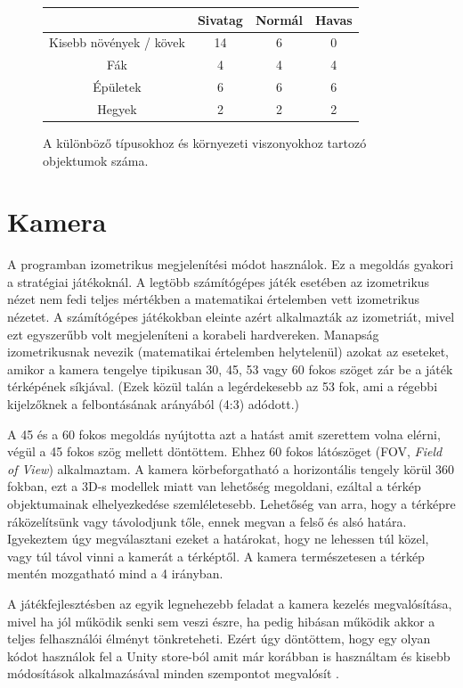 \begin{figure}[h!]
  \centering
  \begin{tabular}{ | c | c | c | c | }
    \hline
     & Sivatag & Normál & Havas \\ \hline
    Kisebb növények / kövek & 14 & 6 & 0 \\ \hline
    Fák & 4 & 4 & 4 \\ \hline
    Épületek & 6 & 6 & 6 \\ \hline
    Hegyek & 2 & 2 & 2 \\ \hline
  \end{tabular}
  \caption{A különböző típusokhoz és környezeti viszonyokhoz tartozó objektumok száma.}
  \label{tab:models}
\end{figure}

\section{Kamera}

A programban izometrikus megjelenítési módot használok. Ez a megoldás gyakori a stratégiai játékoknál. A legtöbb számítógépes játék esetében az izometrikus nézet nem fedi teljes mértékben a matematikai értelemben vett izometrikus nézetet. A számítógépes játékokban eleinte azért alkalmazták az izometriát, mivel ezt egyszerűbb volt megjeleníteni a korabeli hardvereken. Manapság  izometrikusnak nevezik (matematikai értelemben helytelenül) azokat az eseteket, amikor a kamera tengelye tipikusan 30, 45, 53 vagy 60 fokos szöget zár be a játék térképének síkjával. (Ezek közül talán a legérdekesebb az 53 fok, ami a régebbi kijelzőknek a felbontásának arányából (4:3) adódott.)

A 45 és a 60 fokos megoldás nyújtotta azt a hatást amit szerettem volna elérni, végül a 45 fokos szög mellett döntöttem. Ehhez 60 fokos látószöget (FOV, \textit{Field of View}) alkalmaztam. A kamera körbeforgatható a horizontális tengely körül 360 fokban, ezt a 3D-s modellek miatt van lehetőség megoldani, ezáltal a térkép objektumainak elhelyezkedése szemléletesebb. Lehetőség van arra, hogy a térképre ráközelítsünk vagy távolodjunk tőle, ennek megvan a felső és alsó határa. Igyekeztem úgy megválasztani ezeket a határokat, hogy ne lehessen túl közel, vagy túl távol vinni a kamerát a térképtől. A kamera természetesen a térkép mentén mozgatható mind a 4 irányban. 

A játékfejlesztésben az egyik legnehezebb feladat a kamera kezelés megvalósítása, mivel ha jól működik senki sem veszi észre, ha pedig hibásan működik akkor a teljes felhasználói élményt tönkreteheti. Ezért úgy döntöttem, hogy egy olyan kódot használok fel a Unity store-ból amit már korábban is használtam és kisebb módosítások alkalmazásával minden szempontot megvalósít \cite{unitycamera}.

